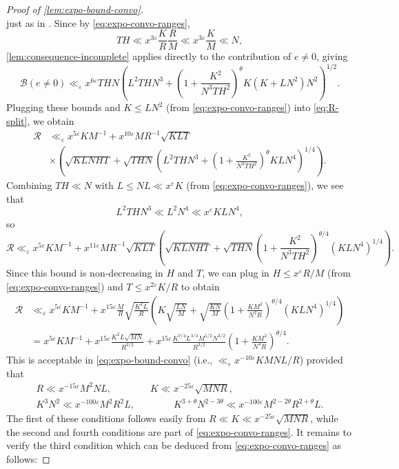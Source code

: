 \documentclass[reqno,11pt]{amsart}
\theoremstyle{remark}
\numberwithin{equation}{section}
\newcommand{\mB}{\mathcal{B}}
\newcommand{\mR}{\mathcal{R}}
\newcommand{\eps}{\varepsilon}
\begin{document}
\begin{proof}[Proof of \cref{lem:expo-bound-convo}]
\[\]
just as in \cite[(3.24)]{drappeau2015theoremes}. Since by \cref{eq:expo-convo-ranges},
\[
    TH \ll x^{3\eps} \frac{K}{R} \frac{R}{M} \ll x^{3\eps} \frac{K}{M} \ll N,
\] 
\cref{lem:consequence-incomplete} applies directly to the contribution of $e \neq 0$, giving
\[
    \mB(e \neq 0) \ll_{\eps} x^{6\eps} THN 
    \left(L^2 TH N^3 + \left(1 + \frac{K^2}{N^3 TH^2}\right)^\theta K \left(K + LN^2\right)N^2 \right)^{1/2}.
\]
Plugging these bounds and $K \le LN^2$ (from \cref{eq:expo-convo-ranges}) into \cref{eq:R-split}, we obtain
\[
\begin{aligned}
    \mR &\ll_{\eps} x^{5\eps} K M^{-1} +
    x^{10\eps} M R^{-1} \sqrt{KLT} 
    \\
    &\times \left(\sqrt{KLNHT} + \sqrt{THN} 
    \left(L^2 TH N^3 + \left(1 + \frac{K^2}{N^3 TH^2}\right)^\theta K L N^4 \right)^{1/4}\right).
\end{aligned}
\]
Combining $TH \ll N$ with $L \le NL \ll x^\eps K$ (from \cref{eq:expo-convo-ranges}), we see that
\[
    L^2 T H N^3 \ll L^2 N^4 \ll x^\eps KLN^4,
\]
so 
\[
    \mR \ll_{\eps} x^{5\eps} K M^{-1} +
    x^{11\eps} M R^{-1} \sqrt{KLT} \left(\sqrt{KLNHT} + \sqrt{THN} 
    \left(1 + \frac{K^2}{N^3 TH^2}\right)^{\theta/4} \left(K L N^4 \right)^{1/4} \right).
\]
Since this bound is non-decreasing in $H$ and $T$, we can plug in $H \le x^\eps R/M$ (from \cref{eq:expo-convo-ranges}) and $T \le x^{2\eps} K/R$ to obtain
\[
\begin{aligned}
    \mR 
    &\ll_{\eps} x^{5\eps} K M^{-1} +
    x^{15\eps} \frac{M}{R} \sqrt{\frac{K^2L}{R}} \left(K\sqrt{\frac{LN}{M}} + \sqrt{\frac{KN}{M}} 
    \left(1 + \frac{K M^2}{N^3 R}\right)^{\theta/4} \left(K L N^4 \right)^{1/4}\right)
    \\
    &=
    x^{5\eps} K M^{-1} + 
    x^{15\eps} \frac{K^2 L \sqrt{MN}}{R^{3/2}}
    +
    x^{15\eps} \frac{K^{7/4} L^{3/4} M^{1/2} N^{3/2}}{R^{3/2}} \left(1 + \frac{K M^2}{N^3 R}\right)^{\theta/4}.
\end{aligned}
\]
This is acceptable in \cref{eq:expo-bound-convo} (i.e., $\ll_{\eps} x^{-10\eps} KMNL/R$) provided that
\[
\begin{gathered}
    R \ll x^{-15\eps} M^2 N L,
    \qquad\qquad 
    K \ll x^{-25\eps} \sqrt{M N R},
    \\
    K^{3} N^{2} \ll x^{-100\eps} M^2 R^2 L,
    \qquad\qquad
    K^{3+\theta} N^{2-3\theta} \ll x^{-100\eps} M^{2-2\theta} R^{2+\theta} L.
\end{gathered}
\]
The first of these conditions follows easily from $R \ll K \ll x^{-25\eps} \sqrt{MNR}$, while the second and fourth conditions are part of \cref{eq:expo-convo-ranges}. It remains to verify the third condition which can be deduced from \cref{eq:expo-convo-ranges} as follows:

\end{proof}
\end{document}
